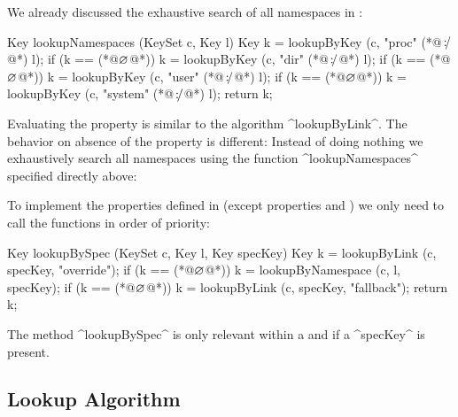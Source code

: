 We already discussed the exhaustive search of all namespaces in :

\begin{code}[language=Cpp,morekeywords={is,of},escapeinside={(*@}{@*)}]
Key lookupNamespaces (KeySet c, Key l)
{
	Key k = lookupByKey (c, "proc" (*@$\operatorname*{\mathnormal{\colon\!\!\!/}}$@*) l);
	if (k == (*@$\varnothing$@*)) k = lookupByKey (c, "dir" (*@$\operatorname*{\mathnormal{\colon\!\!\!/}}$@*)  l);
	if (k == (*@$\varnothing$@*)) k = lookupByKey (c, "user" (*@$\operatorname*{\mathnormal{\colon\!\!\!/}}$@*)  l);
	if (k == (*@$\varnothing$@*)) k = lookupByKey (c, "system" (*@$\operatorname*{\mathnormal{\colon\!\!\!/}}$@*)  l);
	return k;
}
\end{code}

Evaluating the property  is similar to the algorithm ^lookupByLink^.
The behavior on absence of the property is different:
Instead of doing nothing we exhaustively search all namespaces using the function ^lookupNamespaces^ specified directly above:


To implement the properties defined in  (except properties  and ) we only need to call the functions in order of priority:

\label{sec:lookup-by-spec}
\begin{code}[language=Cpp,escapeinside={(*@}{@*)}]
Key lookupBySpec (KeySet c, Key l, Key specKey)
{
	Key k = lookupByLink (c, specKey, "override");
	if (k == (*@$\varnothing$@*)) k = lookupByNamespace (c, l, specKey);
	if (k == (*@$\varnothing$@*)) k = lookupByLink (c, specKey, "fallback");
	return k;
}
\end{code}

The method ^lookupBySpec^ is only relevant within a  and if a ^specKey^ is present.


\subsection{Lookup Algorithm}

